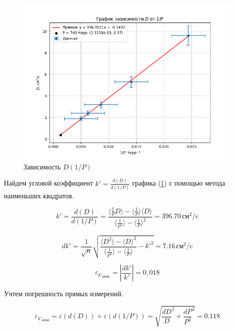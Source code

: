 \documentclass[a4paper,12pt]{article} %
\begin{document}
\begin{enumerate}
  \begin{figure}[h!]
    \centering
    \includegraphics[scale = 0.75]{graph_D_1P.png}
    \caption{Зависимость $D(1/P)$}
    \label{fig:D_1P}
  \end{figure}

  Найдем угловой коэффициент $k' = \frac{d(D)}{d(1/P)}$ графика (\ref{fig:D_1P}) с помощью метода наименьших квадратов.

  \begin{equation}
    k' = \frac{d(D)}{d(1/P)} = \frac{\langle \frac{1}{P} D \rangle - \langle \frac{1}{P} \rangle \langle D \rangle}{\langle \frac{1}{P^2} \rangle - \langle \frac{1}{P} \rangle ^2} = 396.70 \, \text{см}^2 / \text{c}
    \label{k1}
  \end{equation}

  \begin{equation}
    \label{dk1}
    dk' = \frac{1}{\sqrt{n}} \sqrt{\frac{\langle D^2 \rangle - \langle D \rangle ^2}{\langle \frac{1}{P^2} \rangle - \langle \frac{1}{P} \rangle} - k'^2} = 7.16 \, \text{см}^2 / \text{c}
  \end{equation}

  \begin{equation}
    \label{ek}
    \varepsilon_{k'_{\text{МНК}}} = \left| \frac{dk'}{k'} \right| = 0,018
  \end{equation}

  Учтем погрешность прямых измерений.

  \begin{equation}
    \varepsilon_{k'_{\text{ИЗМ}}}= \varepsilon ({d(D)}) + \varepsilon({d(1/P)}) = \sqrt{\frac{dD}{D}^2 + \frac{dP}{P^2}^2} = 0.118
  \end{equation}


\end{enumerate}
\end{document}
